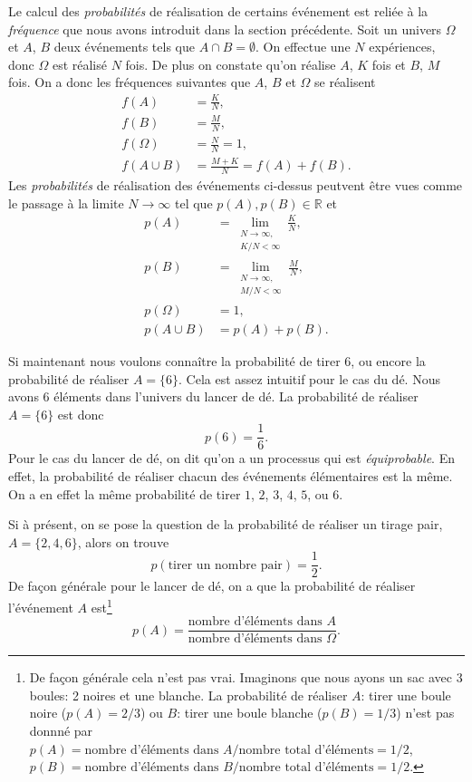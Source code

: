 \documentclass[a4paper,12pt]{book}
\newcommand{\real}{\mathbb{R}}
\begin{document}
Le calcul des \textit{probabilités} de réalisation de certains événement est reliée à la \textit{fréquence} 
que nous avons introduit dans la section précédente. Soit un univers $\Omega$ et $A$, $B$ deux événements tels que $A\cap B=\emptyset$.
On effectue une $N$ expériences, donc $\Omega$ est réalisé $N$ fois. De plus on constate qu'on réalise $A$, $K$ fois et $B$, $M$ fois. 
On a donc les fréquences suivantes que $A$, $B$ et $\Omega$ se réalisent
\begin{align}
 f(A)&=\frac{K}{N},\\
 f(B)&=\frac{M}{N},\\
 f(\Omega)&=\frac{N}{N}=1,\\
 f(A\cup B)&=\frac{M+K}{N}=f(A)+f(B).
\end{align}
Les \textit{probabilités} de réalisation des événements ci-dessus peutvent être vues comme le passage à la limite
$N\rightarrow\infty$ tel que $p(A),p(B)\in\real$ et
\begin{align}
 p(A)&=\lim_{\substack{N\rightarrow\infty,\\ K/N<\infty}}\frac{K}{N},\\
 p(B)&=\lim_{\substack{N\rightarrow\infty,\\ M/N<\infty}}\frac{M}{N},\\
 p(\Omega)&=1,\\
 p(A\cup B)&=p(A)+p(B).
\end{align}

Si maintenant nous voulons connaître la probabilité de tirer $6$, ou encore la probabilité de réaliser $A=\{6\}$.  
Cela est assez intuitif pour le cas du dé. Nous avons $6$ éléments dans l'univers
du lancer de dé. La probabilité de réaliser $A=\{6\}$ est donc
\begin{equation}
 p(6)=\frac{1}{6}.
\end{equation}
Pour le cas du lancer de dé, on dit qu'on a un processus qui est \textit{équiprobable}. En effet,
la probabilité de réaliser chacun des événements élémentaires est la même. On a en effet la même probabilité de tirer 
$1$, $2$, $3$, $4$, $5$, ou $6$.

Si à présent, on se pose la question de la probabilité de réaliser un tirage pair, $A=\{2,4,6\}$, 
alors on trouve 
\begin{equation}
 p(\mbox{tirer un nombre pair})=\frac{1}{2}.
\end{equation}
De façon générale pour le lancer de dé, on a que la probabilité de réaliser l'événement $A$ est\footnote{De façon générale cela n'est pas vrai. Imaginons que nous
ayons un sac avec 3 boules: 2 noires et une blanche. La probabilité de réaliser $A$: tirer une boule noire ($p(A)=2/3$) ou $B$: tirer une boule blanche ($p(B)=1/3$) 
n'est pas donnné par $p(A)=\mbox{nombre d'éléments dans }A/\mbox{nombre total d'éléments}=1/2$, $p(B)=\mbox{nombre d'éléments dans }B/\mbox{nombre total d'éléments}=1/2$.}
\begin{equation}
p(A)=\frac{\mbox{nombre d'éléments dans }A}{\mbox{nombre d'éléments dans }\Omega}.
\end{equation}
\end{document}
